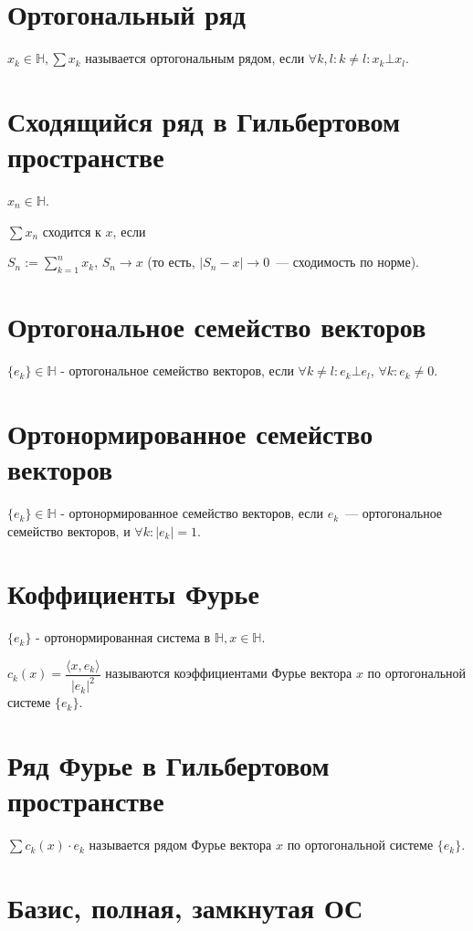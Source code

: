 \documentclass[paper=a4, fontsize=17pt]{article}
\begin{document}
	\section{Ортогональный ряд}
	$x_k \in \mathds{H}, \sum x_k$ называется ортогональным рядом, если $\forall k, l: k \neq l: x_k \bot x_l$.

	\section{Сходящийся ряд в Гильбертовом пространстве}
	$x_n \in \mathds{H}$.

	$\sum x_n$ сходится к $x$, если

	$S_n := \sum\limits_{k = 1}^n x_k$, $S_n \rightarrow x$ (то есть, $|S_n - x| \rightarrow 0$~--- сходимость по норме).

	\section{Ортогональное семейство векторов}
	$\{e_k\} \in \mathds{H}$ - ортогональное семейство векторов, если $\forall k \neq l: e_k \bot e_l$, $\forall k: e_k \neq 0$.

	\section{Ортонормированное семейство векторов}
	$\{e_k\} \in \mathds{H}$ - ортонормированное семейство векторов, если ${e_k}$~--- ортогональное семейство векторов, и $\forall k: |e_k| = 1$.

	\section{Коффициенты Фурье}
	$\{e_k\}$ - ортонормированная система в $\mathds{H}, x \in \mathds{H}$.

	$c_k(x) = \dfrac{\langle x, e_k \rangle}{|e_k|^2}$ называются коэффициентами Фурье вектора $x$ по ортогональной системе $\{e_k\}$.

	\section{Ряд Фурье в Гильбертовом пространстве}

	$\sum c_k(x) \cdot e_k$ называется рядом Фурье вектора $x$ по ортогональной системе $\{e_k\}$.

	\section{Базис, полная, замкнутая ОС}
\end{document}
